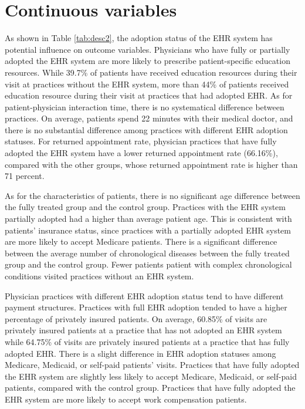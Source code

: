 \documentclass[12pt]{report}
\begin{document}
\section{Continuous variables}
As shown in Table \ref{tab:desc2}, the adoption status of the EHR system has potential influence on outcome variables. Physicians who have fully or partially adopted the EHR system are more likely to prescribe patient-specific education resources. While 39.7\% of patients have received education resources during their visit at practices without the EHR system, more than 44\% of patients received education resource during their visit at practices that had adopted EHR. As for patient-physician interaction time, there is no systematical difference between practices. On average, patients spend 22 minutes with their medical doctor, and there is no substantial difference among practices with different EHR adoption statuses. For returned appointment rate, physician practices that have fully adopted the EHR system have a lower returned appointment rate (66.16\%), compared with the other groups, whose returned appointment rate is higher than 71 percent.

As for the characteristics of patients, there is no significant age difference between the fully treated group and the control group. Practices with the EHR system partially adopted had a higher than average patient age. This is consistent with patients' insurance status, since practices with a partially adopted EHR system are more likely to accept Medicare patients. There is a significant difference between the average number of chronological diseases between the fully treated group and the control group. Fewer patients patient with complex chronological conditions visited practices without an EHR system. 

Physician practices with different EHR adoption status tend to have different payment structures. Practices with full EHR adoption tended to have a higher percentage of privately insured patients. On average, 60.85\% of visits are privately insured patients at a practice that has not adopted an EHR system while 64.75\% of visits are privately insured patients at a practice that has fully adopted EHR. There is a slight difference in EHR adoption statuses among Medicare, Medicaid, or self-paid patients' visits. Practices that have fully adopted the EHR system are slightly less likely to accept Medicare, Medicaid, or self-paid patients, compared with the control group. Practices that have fully adopted the EHR system are more likely to accept work compensation patients.
\end{document}
